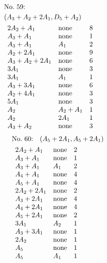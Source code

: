 %
%
\begin{align*}
&\hbox to 4cm {\textrm{No.~59:}\quad\hss}\\ 
&(A_{3}+A_{2}+2A_{1}, D_{5}+A_{2})\\ 
&\begin{array}{lll}
2A_{2}+A_{1} & \none & 8\\
A_{3}+A_{1} & \none & 1\\
A_{3}+A_{1} & A_{1} & 2\\
A_{2}+2A_{1} & \none & 9\\
A_{3}+A_{2}+2A_{1} & \none & 6\\
3A_{1} & \none & 3\\
3A_{1} & A_{1} & 1\\
A_{3}+3A_{1} & \none & 6\\
A_{2}+4A_{1} & \none & 3\\
5A_{1} & \none & 3\\
A_{2} & A_{2}+A_{1} & 1\\
A_{2} & 2A_{1} & 1\\
A_{3}+A_{2} & \none & 3\\
\end{array}
\end{align*}
%
%
\begin{align*}
&\hbox to 4cm {\textrm{No.~60:}\quad$(A_{5}+2A_{1}, A_{5}+2A_{1})$\hss}\\ 
&\begin{array}{lll}
2A_{2}+A_{1} & \none & 2\\
A_{3}+A_{1} & \none & 1\\
A_{3}+A_{1} & A_{1} & 2\\
A_{4}+A_{1} & \none & 4\\
A_{5}+A_{1} & \none & 4\\
2A_{2}+2A_{1} & \none & 2\\
A_{3}+2A_{1} & \none & 4\\
A_{4}+2A_{1} & \none & 4\\
A_{5}+2A_{1} & \none & 2\\
3A_{1} & A_{2} & 1\\
A_{3}+3A_{1} & \none & 1\\
2A_{2} & \none & 1\\
A_{5} & \none & 1\\
A_{5} & A_{1} & 1\\
\end{array}
\end{align*}
%
%
